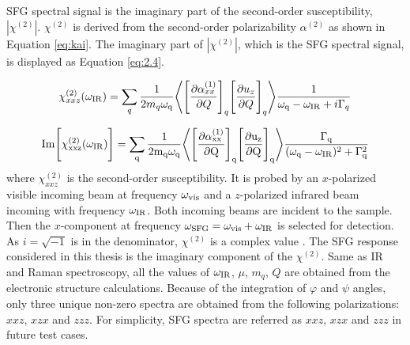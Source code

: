 SFG spectral signal is the imaginary part of the second-order susceptibility, $\left|\chi^{(2)}\right|$. $\chi^{(2)}$ is derived from the second-order polarizability $\alpha^{(2)}$ as shown in Equation \ref{eq:kai}. The imaginary part of $\left|\chi^{(2)}\right|$, which is the SFG spectral signal, is displayed as Equation \ref{eq:2.4}.

\begin{equation} \label{eq:kai}
\chi^{(2)}_{xxz} (\omega_{\rm IR}) = \sum_{q} \frac{1}{2 m_{q} \omega_{\rm q}} \Bigg \langle \Bigg\lbrack \frac{\partial \alpha_{xx}^{(1)}}{\partial Q} \Bigg\rbrack_{q} \Bigg\lbrack \frac{\partial u_{z}}{\partial Q} \Bigg\rbrack_{q} \Bigg\rangle \frac{1}{\omega_{\rm q}-\omega_{\rm IR}+i\Gamma_q}
\end{equation} 

\begin{equation} \label{eq:2.4}
\rm Im \Bigg\lbrack \chi^{(2)}_{xxz} (\omega_{\rm IR}) \Bigg\rbrack= \sum_{q} \frac{1}{2 m_{q} \omega_{\rm q}} \Bigg \langle \Bigg\lbrack \frac{\partial \alpha_{xx}^{(1)}}{\partial Q} \Bigg\rbrack_{q} \Bigg\lbrack \frac{\partial u_{z}}{\partial Q} \Bigg\rbrack_{q} \Bigg\rangle \frac{\Gamma_q}{(\omega_{\rm q}-\omega_{\rm IR})^{2}+\Gamma_q^{2}}
\end{equation} 
where $\chi^{(2)}_{xxz}$ is the second-order susceptibility. It is probed by an $x$-polarized visible incoming beam at frequency $\omega_{\rm vis}$ and a $z$-polarized infrared beam incoming with frequency $\omega_{\rm IR}$. Both incoming beams are incident to the sample. Then the $x$-component at frequency $\omega_{\rm SFG}=\omega_{\rm vis}+\omega_{\rm IR}$ is selected for detection. As $i=\sqrt{-1}$ is in the denominator, $\chi^{(2)}$ is a complex value \cite{KuoKaiHung:Thesis:2015}. The SFG response considered in this thesis is the imaginary component of the $\chi^{(2)}$. Same as IR and Raman spectroscopy, all the values of $\omega_{\rm IR}$, $\mu$, $m_q$, $Q$ are obtained from the electronic structure calculations. Because of the integration of $\varphi$ and $\psi$ angles, only three unique non-zero spectra are obtained from the following polarizations: $xxz$, $xzx$ and $zzz$. For simplicity, SFG spectra are referred as $xxz$, $xzx$ and $zzz$ in future test cases. \\


